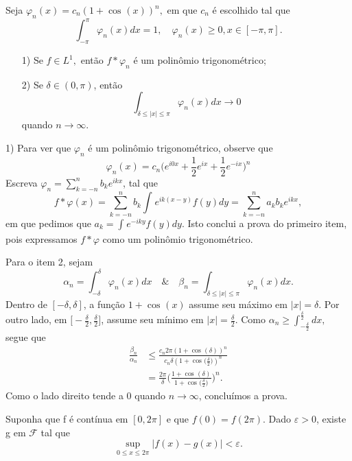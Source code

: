 \documentclass[measure_theory.tex]{subfiles}
\begin{document}
Seja \(\varphi_{n}(x) = c_{n}(1+\cos^{}{(x)})^{n},\) em que \(c_{n}\) é escolhido tal que
\[
	\int_{-\pi }^{\pi }\varphi_{n}(x)dx = 1,\quad \varphi_{n}(x)\geq 0, x\in [-\pi, \pi ].
\]
\begin{lemma*}
	\begin{itemize}
		\item[1)] Se \(f\in L^{1},\) então \(f*\varphi_{n}\) é um polinômio trigonométrico;
		\item[2)] Se \(\delta\in (0, \pi )\), então
		      \[
			      \int_{\delta \leq |x| \leq \pi }^{}\varphi_{n}(x)dx\to 0
		      \]
		      quando \(n\to \infty\).
	\end{itemize}
\end{lemma*}
\begin{proof*}
	1) Para ver que \(\varphi_{n}\) é um polinômio trigonométrico, observe que
	\[
		\varphi_{n}(x) = c_{n}\biggl(e^{i0x} + \frac{1}{2}e^{ix} + \frac{1}{2}e^{-ix}\biggr)^{n}
	\]
	Escreva \(\varphi_{n} = \sum\limits_{k=-n}^{n}b_{k}e^{ikx}\), tal que
	\[
		f*\varphi (x) = \sum\limits_{k=-n}^{n}b_{k}\int_{}^{}e^{ik(x-y)}f(y)dy = \sum\limits_{k=-n}^{n}a_{k}b_{k}e^{ikx},
	\]
	em que pedimos que \(a_{k} = \int_{}^{}e^{-iky}f(y)dy\). Isto conclui a prova do primeiro item, pois expressamos \(f*\varphi \) como um polinômio trigonométrico.

	Para o item 2, sejam
	\[
		\alpha_{n} = \int_{-\delta }^{\delta }\varphi_{n}(x)dx \quad\&\quad  \beta_{n} = \int_{\delta \leq |x|\leq \pi }^{}\varphi_{n}(x)dx.
	\]
	Dentro de \([-\delta , \delta ]\), a função \(1 + \cos^{}{(x)}\) assume seu máximo em \(|x| = \delta \). Por outro lado, em \(\biggl[-\frac{\delta }{2}, \frac{\delta }{2}\biggr]\), assume
	seu mínimo em \(|x| = \frac{\delta }{2}.\) Como \(\alpha_{n} \geq \int_{-\frac{\delta }{2}}^{\frac{\delta }{2}}dx,\) segue que
	\begin{align*}
		\frac{\beta_{n}}{\alpha_{n}} & \leq \frac{c_{n}2\pi (1+\cos^{}{(\delta )})^{n}}{c_{n}\delta (1+\cos^{}{\biggl(\frac{\delta }{2}\biggr)})^{n}}      \\
		                             & = \frac{2\pi }{\delta }\biggl(\frac{1+\cos^{}{(\delta )}}{1 + \cos^{}{\biggl(\frac{\delta }{2}\biggr)}}\biggr)^{n}.
	\end{align*}
	Como o lado direito tende a 0 quando \(n\to \infty\), concluímos a prova. \qedsymbol
\end{proof*}
\begin{theorem*}
	Suponha que f é contínua em \([0, 2\pi ]\) e que \(f(0) = f(2\pi ).\) Dado \(\varepsilon  > 0\), existe g em \(\mathcal{F}\) tal que
	\[
		\sup_{0 \leq x \leq 2\pi }|f(x)-g(x)| < \varepsilon .
	\]
\end{theorem*}
\end{document}
